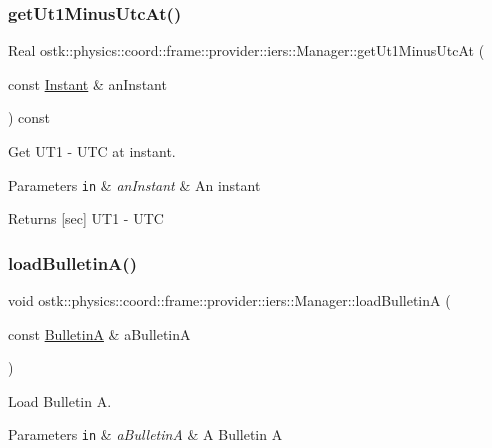 \subsubsection{\texorpdfstring{get\+Ut1\+Minus\+Utc\+At()}{getUt1MinusUtcAt()}}
{\footnotesize\ttfamily Real ostk\+::physics\+::coord\+::frame\+::provider\+::iers\+::\+Manager\+::get\+Ut1\+Minus\+Utc\+At (\begin{DoxyParamCaption}\item[{const \hyperlink{classostk_1_1physics_1_1time_1_1_instant}{Instant} \&}]{an\+Instant }\end{DoxyParamCaption}) const}



Get U\+T1 -\/ U\+TC at instant. 


\begin{DoxyParams}[1]{Parameters}
\mbox{\tt in}  & {\em an\+Instant} & An instant \\
\hline
\end{DoxyParams}
\begin{DoxyReturn}{Returns}
\mbox{[}sec\mbox{]} U\+T1 -\/ U\+TC 
\end{DoxyReturn}
\mbox{\label{classostk_1_1physics_1_1coord_1_1frame_1_1provider_1_1iers_1_1_manager_a57d53edcf28bd7d02181384e9ea63dab}} 
\subsubsection{\texorpdfstring{load\+Bulletin\+A()}{loadBulletinA()}}
{\footnotesize\ttfamily void ostk\+::physics\+::coord\+::frame\+::provider\+::iers\+::\+Manager\+::load\+BulletinA (\begin{DoxyParamCaption}\item[{const \hyperlink{classostk_1_1physics_1_1coord_1_1frame_1_1provider_1_1iers_1_1_bulletin_a}{BulletinA} \&}]{a\+BulletinA }\end{DoxyParamCaption})}



Load Bulletin A. 


\begin{DoxyParams}[1]{Parameters}
\mbox{\tt in}  & {\em a\+BulletinA} & A Bulletin A \\
\hline
\end{DoxyParams}
\mbox{\label{classostk_1_1physics_1_1coord_1_1frame_1_1provider_1_1iers_1_1_manager_ad79ddb22cfd125d810840611c24a9f42}} 
